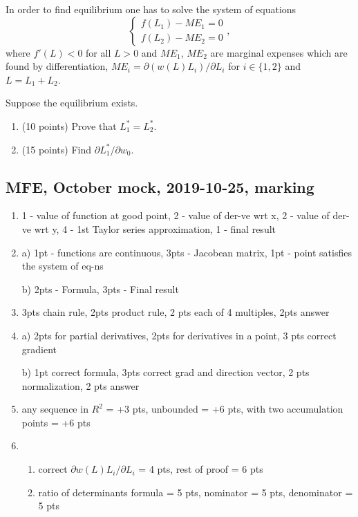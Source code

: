 \begin{enumerate}
  In order to find equilibrium one has to solve the system of equations
  \[
  \begin{cases}
    f(L_1) - ME_1 = 0 \\
    f(L_2) - ME_2 = 0
  \end{cases},
  \]
  where $f'(L)<0$ for all $L>0$ 
  and $ME_1$, $ME_2$ are marginal expenses which are found by differentiation, 
  $ME_i = \partial (w(L)L_i)/\partial L_i$ for $i \in \{1, 2\}$ and $L = L_1 + L_2$. 
  
  Suppose the equilibrium exists.
  \begin{enumerate}
    \item (10 points) Prove that $L_1^*=L_2^*$.
    \item (15 points) Find $\partial L_1^*/\partial w_0$.
  \end{enumerate}
  
  \end{enumerate}
  

\subsection{MFE, October mock, 2019-10-25, marking}


\begin{enumerate}
  \item 1 - value of function at good point,
  2 - value of der-ve wrt x,
  2 - value of der-ve wrt y,
  4 - 1st Taylor series approximation,
  1 - final result
  
  \item 
  a) 1pt - functions are continuous, 3pts - Jacobean matrix, 1pt - point satisfies the system of eq-ns
  
  
  b) 2pts - Formula, 3pts - Final result
  
  \item 3pts chain rule, 2pts product rule, 2 pts each of 4 multiples, 2pts answer
  
  \item
  a) 2pts for partial derivatives, 2pts for derivatives in a point, 3 pts correct gradient
  
  b) 1pt correct formula, 3pts correct grad and direction vector, 2 pts normalization, 2 pts answer
  
  \item  any sequence in $R^2$ = +3 pts,
  unbounded = +6 pts,
  with two accumulation points = +6 pts

  \item
  \begin{enumerate}
\item correct $\partial w(L)L_i /\partial L_i$ = 4 pts, rest of proof = 6 pts
 \item   ratio of determinants formula = 5 pts, nominator = 5 pts, denominator = 5 pts
  
\end{enumerate}
  

\end{enumerate}
